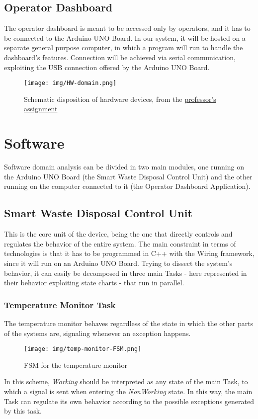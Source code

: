 \documentclass[a4paper,12pt]{report}
\begin{document}
	\subsection{Operator Dashboard}
	The operator dashboard is meant to be accessed only by operators, and it has to be connected to the Arduino UNO Board.\newline
	In our system, it will be hosted on a separate general purpose computer, in which a program will run to handle the dashboard's features. Connection will be achieved via serial communication, exploiting the USB connection offered by the Arduino UNO Board.
	
	\begin{figure}[H]
		\centering{}
		\texttt{[image: img/HW-domain.png]}
		\caption{Schematic disposition of hardware devices, from the \href{https://docs.google.com/document/d/1iFXGmo7RVZMpJ5bxUN5ms_qFqg2B-wecRc0sfas9rQ4/edit?usp=sharing}{professor's assignment}}
		\label{img:hw-domain}
	\end{figure}
	
	\section{Software}
	Software domain analysis can be divided in two main modules, one running on the Arduino UNO Board (the Smart Waste Disposal Control Unit) and the other running on the computer connected to it (the Operator Dashboard Application).
	
	\subsection{Smart Waste Disposal Control Unit}
	This is the core unit of the device, being the one that directly controls and regulates the behavior of the entire system.\newline
	The main constraint in terms of technologies is that it has to be programmed in C++ with the Wiring framework, since it will run on an Arduino UNO Board. Trying to dissect the system's behavior, it can easily be decomposed in three main Tasks - here represented in their behavior exploiting state charts - that run in parallel.
	
	\subsubsection{Temperature Monitor Task}
	The temperature monitor behaves regardless of the state in which the other parts of the systems are, signaling whenever an exception happens.
	\begin{figure}[H]
		\centering{}
		\texttt{[image: img/temp-monitor-FSM.png]}
		\caption{FSM for the temperature monitor}
		\label{img:temp-monitor-FSM}
	\end{figure}
	In this scheme, \emph{Working} should be interpreted as any state of the main Task, to which a signal is sent when entering the \emph{NonWorking} state. In this way, the main Task can regulate its own behavior according to the possible exceptions generated by this task. 
	
\end{document}
